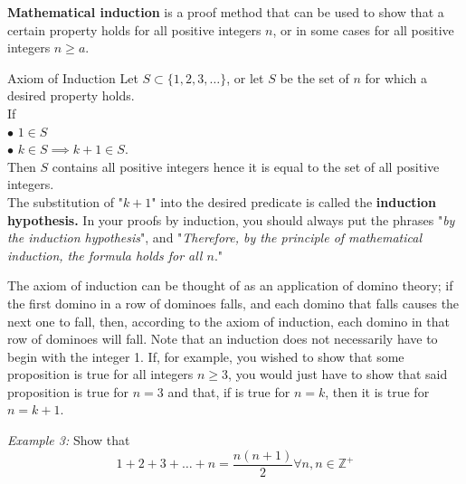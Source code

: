     \noindent \textbf{Mathematical induction} is a proof method that can be used to show that a certain property holds for all positive integers $n$, or in some cases for all positive integers $n\geq a$.

    \begin{tbhtheorem}{Axiom of Induction}
        Let $S\subset \{1,2,3,\dots\}$, or let $S$ be the set of $n$ for which a desired property holds. \\
        If \\
        $\bullet$ $1\in S$ \\
        $\bullet$ $k\in S\implies k+1\in S$. \\
        Then $S$ contains all positive integers hence it is equal to the set of all positive integers. \\

        The substitution of "$k+1$" into the desired predicate is called the \textbf{induction hypothesis.} In your proofs by induction, you should always put the phrases "\textit{by the induction hypothesis}", and
        "\textit{Therefore, by the principle of mathematical induction, the formula holds for all $n$}."
    \end{tbhtheorem}

    \noindent The axiom of induction can be thought of as an application of domino theory; if the first domino in a row of dominoes falls, and each domino that falls causes the next one to fall, then, according
    to the axiom of induction, each domino in that row of dominoes will fall. Note that an induction does not necessarily have to begin with the integer 1. If, for example, you wished to show that some proposition is
    true for all integers $n\geq 3$, you would just have to show that said proposition is true for $n=3$ and that, if is true for $n=k$, then it is true for $n=k+1$.

    \pagebreak

    \noindent \color{blue} \textit{Example 3:} Show that
    \begin{equation*}
        1 + 2 + 3 + \dots + n = \frac{n(n+1)}{2} \forall n, n\in \mathbb{Z}^+
    \end{equation*}
    \color{black}


